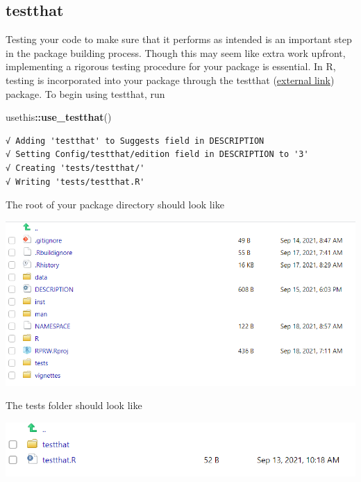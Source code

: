 \documentclass[
]{book}
\newenvironment{Shaded}{\begin{snugshade}}{\end{snugshade}}
\newcommand{\KeywordTok}[1]{\textcolor[rgb]{0.13,0.29,0.53}{\textbf{#1}}}
\newcommand{\NormalTok}[1]{#1}
\newcommand{\OperatorTok}[1]{\textcolor[rgb]{0.81,0.36,0.00}{\textbf{#1}}}
\begin{document}
\hypertarget{testthat}{%
\subsection{testthat}\label{testthat}}

Testing your code to make sure that it performs as intended is an important step in the package building process. Though this may seem like extra work upfront, implementing a rigorous testing procedure for your package is essential. In R, testing is incorporated into your package through the testthat (\href{https://testthat.r-lib.org/}{external link}) package. To begin using testthat, run

\begin{Shaded}
\begin{Highlighting}[]
\NormalTok{usethis}\OperatorTok{::}\KeywordTok{use_testthat}\NormalTok{()}
\end{Highlighting}
\end{Shaded}

\begin{verbatim}
√ Adding 'testthat' to Suggests field in DESCRIPTION
√ Setting Config/testthat/edition field in DESCRIPTION to '3'
√ Creating 'tests/testthat/'
√ Writing 'tests/testthat.R'
\end{verbatim}

The root of your package directory should look like

\includegraphics[width=1\linewidth]{images/newrpack_files3}

The tests folder should look like

\includegraphics[width=1\linewidth]{images/newrpack_files4}
\end{document}
